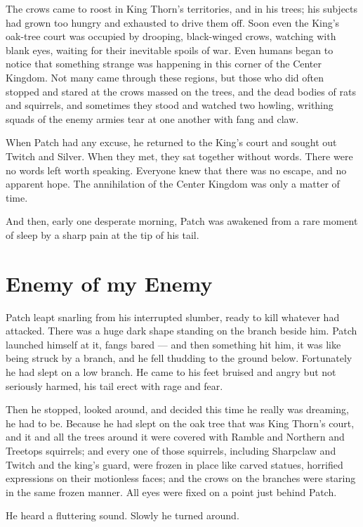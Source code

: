 \documentclass[12pt]{book}
\begin{document}
The crows came to roost in King Thorn's territories, and in his trees;
his subjects had grown too hungry and exhausted to drive them
off. Soon even the King's oak-tree court was occupied by drooping,
black-winged crows, watching with blank eyes, waiting for their
inevitable spoils of war. Even humans began to notice that something
strange was happening in this corner of the Center Kingdom. Not many
came through these regions, but those who did often stopped and stared
at the crows massed on the trees, and the dead bodies of rats and
squirrels, and sometimes they stood and watched two howling, writhing
squads of the enemy armies tear at one another with fang and claw.

When Patch had any excuse, he returned to the King's court and sought
out Twitch and Silver. When they met, they sat together without
words. There were no words left worth speaking. Everyone knew that
there was no escape, and no apparent hope. The annihilation of the
Center Kingdom was only a matter of time.

And then, early one desperate morning, Patch was awakened from a rare
moment of sleep by a sharp pain at the tip of his tail.


\section{Enemy of my Enemy}

Patch leapt snarling from his interrupted slumber, ready to kill
whatever had attacked. There was a huge dark shape standing on the
branch beside him. Patch launched himself at it, fangs bared --- and
then something hit him, it was like being struck by a branch, and he
fell thudding to the ground below. Fortunately he had slept on a low
branch. He came to his feet bruised and angry but not seriously
harmed, his tail erect with rage and fear.

Then he stopped, looked around, and decided this time he really was
dreaming, he had to be. Because he had slept on the oak tree that was
King Thorn's court, and it and all the trees around it were covered
with Ramble and Northern and Treetops squirrels; and every one of
those squirrels, including Sharpclaw and Twitch and the king's guard,
were frozen in place like carved statues, horrified expressions on
their motionless faces; and the crows on the branches were staring in
the same frozen manner. All eyes were fixed on a point just behind
Patch.

He heard a fluttering sound. Slowly he turned around.
\end{document}
